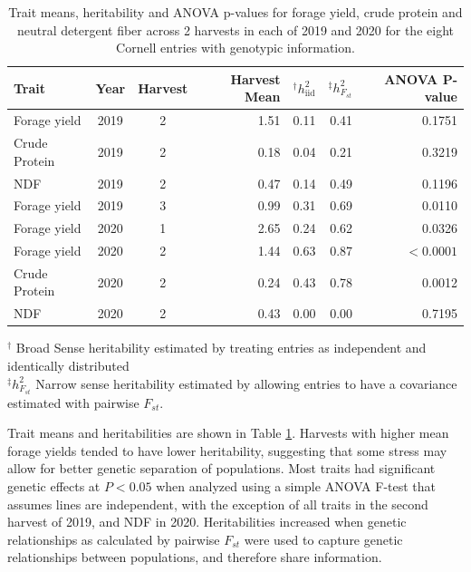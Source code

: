 \documentclass[12pt, letterpaper]{article}
\begin{document}
\begin{table}[ht]
\caption{Trait means, heritability and ANOVA p-values for forage yield, crude protein and neutral detergent fiber across 2 harvests in each of 2019 and 2020 for the eight Cornell entries with genotypic information.}
\centering
\begin{tabular*}{\hsize}{@{\extracolsep{\fill}}lccrrrr}
 Trait & Year & Harvest & Harvest Mean & $^\dagger h^2_\text{iid}$ & $^\ddagger h^2_{F_{st}}$ & ANOVA P-value \\ 
  \hline
  Forage yield & 2019 & 2 & 1.51 & 0.11 & 0.41 & 0.1751 \\ 
  Crude Protein & 2019 & 2 & 0.18 & 0.04 & 0.21 & 0.3219 \\ 
  NDF & 2019 & 2 & 0.47 & 0.14 & 0.49 & 0.1196 \\ 
  Forage yield & 2019 & 3 & 0.99 & 0.31 & 0.69 & 0.0110 \\ 
  Forage yield & 2020 & 1 & 2.65 & 0.24 & 0.62 & 0.0326 \\ 
  Forage yield & 2020 & 2 & 1.44 & 0.63 & 0.87 & $<0.0001$ \\ 
  Crude Protein & 2020 & 2 & 0.24 & 0.43 & 0.78 & 0.0012 \\ 
  NDF & 2020 & 2 & 0.43 & 0.00 & 0.00 & 0.7195 \\ 
   \hline
\end{tabular*}
\raggedright
$^\dagger$ Broad Sense heritability estimated by treating entries as independent and identically distributed \\
$^\ddagger h^2_{F_{st}}$ Narrow sense heritability estimated by allowing entries to have a covariance estimated with pairwise $F_{st}$.
\label{anovaTab}
\end{table}

Trait means and heritabilities are shown in Table \ref{anovaTab}. Harvests with higher mean forage yields tended to have lower heritability, suggesting that some stress may allow for better genetic separation of populations. Most traits had significant genetic effects at $P < 0.05$ when analyzed using a simple ANOVA F-test that assumes lines are independent, with the exception of all traits in the second harvest of 2019, and NDF in 2020. Heritabilities increased when genetic relationships as calculated by pairwise $F_{st}$ were used to capture genetic relationships between populations, and therefore share information. 

\end{document}
